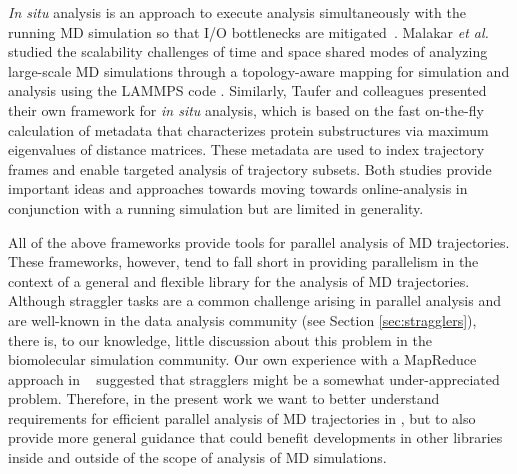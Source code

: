 \textit{In situ} analysis is an approach to execute analysis simultaneously with the running MD simulation so that I/O bottlenecks are  mitigated~\cite{Malakar-etal, Johnston:2017aa}.
Malakar \textit{et al.} studied the scalability challenges of time and space shared modes of analyzing large-scale MD simulations through a topology-aware mapping for simulation and analysis using the LAMMPS code \cite{Malakar-etal}.
Similarly, Taufer and colleagues \cite{Johnston:2017aa} presented their own framework for \textit{in situ} analysis, which is based on the fast on-the-fly calculation of metadata that characterizes protein substructures via maximum eigenvalues of distance matrices.
These metadata are used to index trajectory frames and enable targeted analysis of trajectory subsets.
Both studies provide important ideas and approaches towards moving towards online-analysis in conjunction with a running simulation but are limited in generality.

All of the above frameworks provide tools for parallel analysis of MD trajectories. 
These frameworks, however, tend to fall short in providing parallelism in the context of a general and flexible library for the analysis of MD trajectories.
Although straggler tasks are a common challenge arising in parallel analysis and are well-known in the data analysis community (see Section \ref{sec:stragglers}), there is, to our knowledge, little discussion about this problem in the biomolecular simulation community.
Our own experience with a MapReduce approach in ~\cite{Khoshlessan:2017ab} suggested that stragglers might be a somewhat under-appreciated problem.
Therefore, in the present work we want to better understand requirements for efficient parallel analysis of MD trajectories in , but to also provide more general guidance that could benefit developments in other libraries inside and outside of the scope of analysis of MD simulations.




